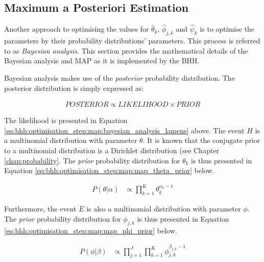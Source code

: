 \subsection{Maximum a Posteriori Estimation}
\label{sec:bhh:optimisation_step:map}

Another approach to optimising the values for $\hat{\theta}_{k}$, $\hat{\phi}_{j,k}$ and $\hat{\psi}_{k}$ is to optimise the parameters by their probability distributions' parameters. This process is referred to as \textit{Bayesian analysis}. This section provides the mathematical details of the Bayesian analysis and \ac{MAP} as it is implemented by the \ac{BHH}.

Bayesian analysis makes use of the \textit{posterior} probability distribution. The posterior distribution is simply expressed as:

\begin{equation*}
    \label{eq:bhh:optimisation_step:map:bayesian_analysis_lamens}
    \begin{split}
        POSTERIOR \propto LIKELIHOOD \times PRIOR
    \end{split}
\end{equation*}

The likelihood is presented in Equation \ref{eq:bhh:optimisation_step:map:bayesian_analysis_lamens} above. The event $H$ is a multinomial distribution with parameter $\theta$. It is known that the conjugate prior to a multinomial distribution is a Dirichlet distribution (see Chapter \ref{chap:probability}. The \textit{prior} probability distribution for  $\theta_{k}$ is thus presented in Equation \ref{eq:bhh:optimisation_step:map:map_theta_prior} below.

\begin{equation}
    \label{eq:bhh:optimisation_step:map:map_theta_prior}
    \begin{split}
        P(\theta | \alpha)
&\propto \prod_{k=1}^{K} \theta_{k}^{\alpha_{k} -1}
    \end{split}
\end{equation}

Furthermore, the event $E$ is also a multinomial distribution with parameter $\phi$. The \textit{prior} probability distribution for $\phi_{j,k}$ is thus presented in Equation \ref{eq:bhh:optimisation_step:map:map_phi_prior} below.

\begin{equation}
    \label{eq:bhh:optimisation_step:map:map_phi_prior}
    \begin{split}
        P(\phi \vert \beta)
&\propto \prod_{j=1}^{J}  \prod_{k=1}^{K} \phi_{j,k}^{\beta_{j,k} -1}
    \end{split}
\end{equation}

